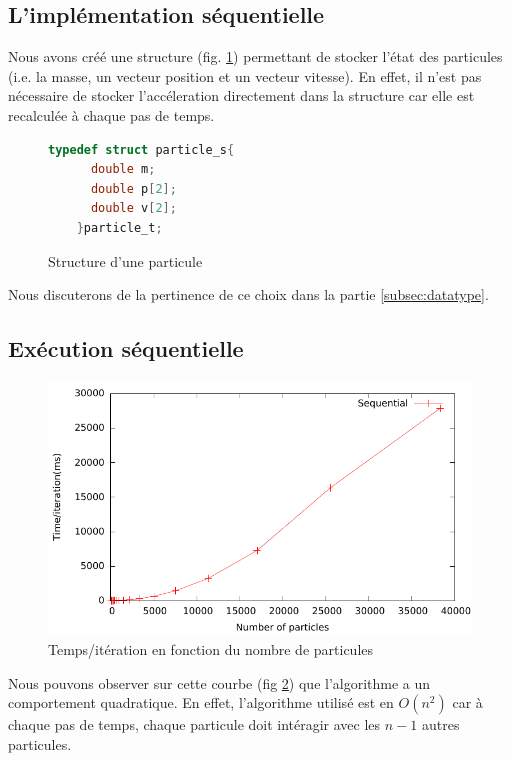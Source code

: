 \documentclass{article}
\begin{document}
\subsection{L'implémentation séquentielle}
Nous avons créé une structure (fig. \ref{struct}) permettant de stocker l'état des particules (i.e. la masse, un vecteur position et un vecteur vitesse). En effet, il n'est pas nécessaire de stocker l'accéleration directement dans la structure car elle est recalculée à chaque pas de temps.

\begin{figure}[h]
  \centering
  \begin{lstlisting}[language=C]
    typedef struct particle_s{
      double m;
      double p[2];
      double v[2];
    }particle_t;\end{lstlisting}
  \caption{\label{struct}Structure d'une particule}
\end{figure}

Nous discuterons de la pertinence de ce choix dans la partie \ref{subsec:datatype}.



\subsection{Exécution séquentielle}

\begin{figure}[h]
  \centering
  \includegraphics[scale=0.7]{ResultTDP2/seq_temps_iter/seq.pdf}
  \caption{\label{seq_ti}Temps/itération en fonction du nombre de particules}
  
\end{figure}
Nous pouvons observer sur cette courbe (fig \ref{seq_ti}) que l'algorithme a un comportement quadratique. En effet, l'algorithme utilisé est en $ O(n^2) $ car à chaque pas de temps, chaque particule doit intéragir avec les $ n-1 $ autres particules.
\end{document}
